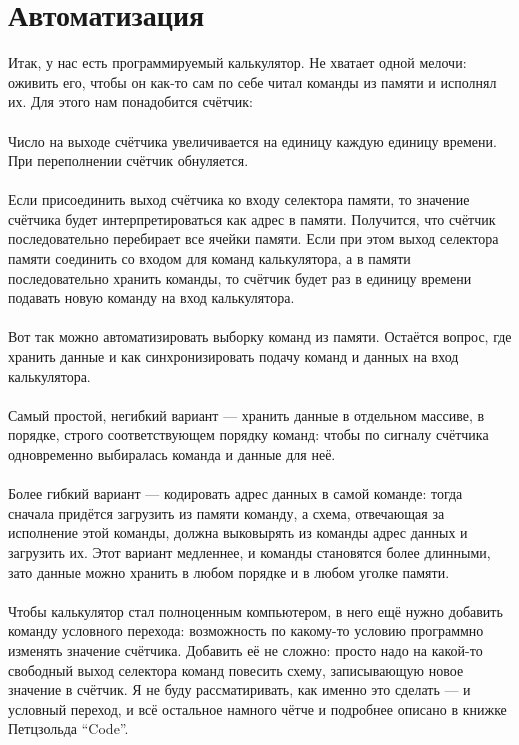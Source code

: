 \documentclass[11pt]{book}
\begin{document}
\section{Автоматизация}
Итак, у нас есть программируемый калькулятор.
Не хватает одной мелочи: оживить его, чтобы он как-то сам по себе читал команды из памяти и исполнял их.
Для этого нам понадобится счётчик:
\\
\\
Число на выходе счётчика увеличивается на единицу каждую единицу времени.
При переполнении счётчик обнуляется.
\\ \\
Если присоединить выход счётчика ко входу селектора памяти,
то значение счётчика будет интерпретироваться как адрес в памяти.
Получится, что счётчик последовательно перебирает все ячейки памяти.
Если при этом выход селектора памяти соединить со входом для команд калькулятора,
а в памяти последовательно хранить команды,
то счётчик будет раз в единицу времени подавать новую команду на вход калькулятора.
\\
\\
Вот так можно автоматизировать выборку команд из памяти.
Остаётся вопрос, где хранить данные и как синхронизировать подачу команд и данных на вход калькулятора.
\\ \\
Самый простой, негибкий вариант --- хранить данные в отдельном массиве, в порядке,
строго соответствующем порядку команд: чтобы по сигналу счётчика
одновременно выбиралась команда и данные для неё.
\\ \\
Более гибкий вариант --- кодировать адрес данных в самой команде:
тогда сначала придётся загрузить из памяти команду, а схема, отвечающая за исполнение этой команды,
должна выковырять из команды адрес данных и загрузить их.
Этот вариант медленнее, и команды становятся более длинными, зато данные можно хранить в любом порядке и в любом уголке памяти.
\\ \\
Чтобы калькулятор стал полноценным компьютером, в него ещё нужно добавить команду условного перехода:
возможность по какому-то условию программно изменять значение счётчика.
Добавить её не сложно: просто надо на какой-то свободный выход селектора команд повесить схему,
записывающую новое значение в счётчик.
Я не буду рассматиривать, как именно это сделать --- и условный переход, и всё остальное
намного чётче и подробнее описано в книжке Петцзольда ``Code''.
\end{document}
